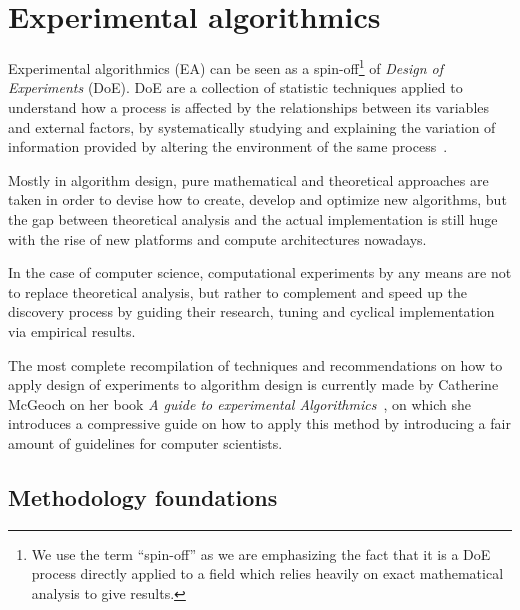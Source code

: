 \section{Experimental algorithmics}
\label{SECTION:EXPERIMENTAL_ALGORITHMICS}
Experimental algorithmics (EA) can be seen as a spin-off\footnote{We use the term ``spin-off'' as we are emphasizing the fact that it is a DoE process directly applied to a field which relies heavily on exact mathematical analysis to give results. } of \textit{Design of Experiments} (DoE). DoE are a collection of statistic techniques applied to understand how a process is affected by the relationships between its variables and external factors, by systematically studying and explaining the variation of information provided by altering the environment of the same process~\cite{Wagner_Mount_Giles_2014}.

Mostly in algorithm design, pure mathematical and theoretical approaches are taken in order to devise how to create, develop and optimize new algorithms, but the gap between theoretical analysis and the actual implementation is still huge with the rise of new platforms and compute architectures nowadays.

In the case of computer science, computational experiments by any means are not to replace theoretical analysis, but rather to complement and speed up the discovery process by guiding their research, tuning and cyclical implementation via empirical results.

The most complete recompilation of techniques and recommendations on how to apply design of experiments to algorithm design is currently made by Catherine McGeoch on her book \textit{A guide to experimental Algorithmics}~\cite{10.5555/2159557}, on which she introduces a compressive guide on how to apply this method by introducing a fair amount of guidelines for computer scientists.

\subsection{Methodology foundations}

